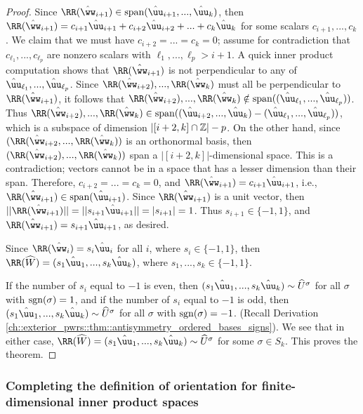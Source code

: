 \begin{proof}
    Since $\RR(\hww_{i + 1}) \in \spann(\huu_{i + 1}, ..., \huu_k)$, then $\RR(\hww_{i + 1}) = c_{i + 1} \huu_{i + 1} + c_{i + 2} \huu_{i + 2} + ... + c_k \huu_k$ for some scalars $c_{i + 1}, ..., c_k$. We claim that we must have $c_{i + 2} = ... = c_k = 0$; assume for contradiction that $c_{\ell_1}, ..., c_{\ell_p}$ are nonzero scalars with $\ell_1, ..., \ell_p > i + 1$. A quick inner product computation shows that $\RR(\hww_{i + 1})$ is not perpendicular to any of $\huu_{\ell_1}, ..., \huu_{\ell_p}$. Since $\RR(\hww_{i + 2}), ..., \RR(\hww_k)$ must all be perpendicular to $\RR(\hww_{i + 1})$, it follows that $\RR(\hww_{i + 2}), ..., \RR(\hww_k) \notin \spann((\huu_{\ell_1}, ..., \huu_{\ell_p}))$. Thus $\RR(\hww_{i + 2}), ..., \RR(\hww_k) \in \spann((\huu_{i + 2}, ..., \huu_k) - (\huu_{\ell_1}, ..., \huu_{\ell_p}))$, which is a subspace of dimension $|[i + 2, k] \cap \mathbb{Z}| - p$. On the other hand, since $(\RR(\hww_{i + 2}, ..., \RR(\hww_k))$ is an orthonormal basis, then $(\RR(\hww_{i + 2}), ..., \RR(\hww_k))$ span a $|[i + 2, k]|$-dimensional space. This is a contradiction; vectors cannot be in a space that has a lesser dimension than their span. Therefore, $c_{i + 2} = ... = c_k = 0$, and $\RR(\hww_{i + 1}) = c_{i + 1} \huu_{i + 1}$, i.e., $\RR(\hww_{i + 1}) \in \spann(\huu_{i + 1})$. Since $\RR(\hww_{i + 1})$ is a unit vector, then $||\RR(\hww_{i + 1})|| = ||s_{i + 1} \huu_{i + 1}|| = |s_{i + 1}| = 1$. Thus $s_{i + 1} \in \{-1, 1\}$, and $\RR(\hww_{i + 1}) = s_{i + 1} \huu_{i + 1}$, as desired.

    \vspace{.25cm}

    Since $\RR(\hww_i) = s_i \huu_i$ for all $i$, where $s_i \in \{-1, 1\}$, then $\RR(\hW) = (s_1 \huu_1, ..., s_k \huu_k)$, where $s_1, ..., s_k \in \{-1, 1\}$. 

    If the number of $s_i$ equal to $-1$ is even, then ${(s_1 \huu_1, ..., s_k \huu_k) \sim \hU^\sigma}$ for all $\sigma$ with $\text{sgn}(\sigma) = 1$, and if the number of $s_i$ equal to $-1$ is odd, then ${(s_1 \huu_1, ..., s_k \huu_k) \sim \hU^\sigma}$ for all $\sigma$ with $\text{sgn}(\sigma) = -1$. (Recall Derivation     \ref{ch::exterior_pwrs::thm::antisymmetry_ordered_bases_signs}). We see that in either case, ${\RR(\hW) = (s_1 \huu_1, ..., s_k \huu_k) \sim \hU^\sigma}$ for some $\sigma \in S_k$. This proves the theorem.
\end{proof}

\subsubsection*{Completing the definition of orientation for finite-dimensional inner product spaces}

